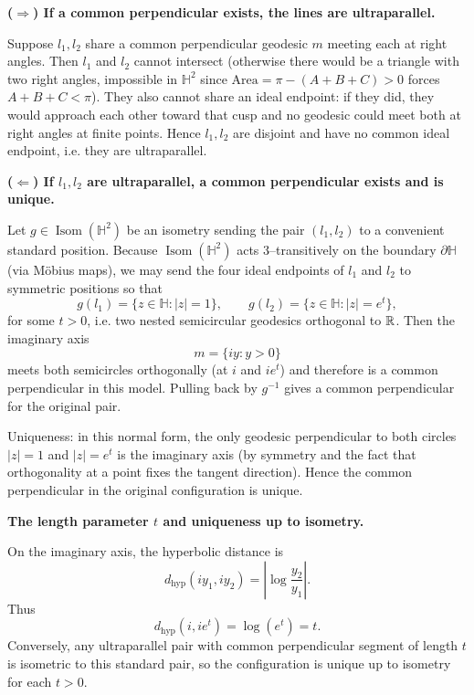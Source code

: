 \begin{solution}
\par\medskip\noindent\textbf{($\Rightarrow$) If a common perpendicular exists, the lines are ultraparallel.}\par\smallskip

	Suppose $l_1,l_2$ share a common perpendicular geodesic $m$ meeting each at right angles. Then $l_1$ and $l_2$
	cannot intersect (otherwise there would be a triangle with two right angles, impossible in $\mathbb{H}^2$ since
	$\text{Area}=\pi-(A+B+C)>0$ forces $A+B+C<\pi$). They also cannot share an ideal endpoint: if they did, they would
	approach each other toward that cusp and no geodesic could meet both at right angles at finite points.
	Hence $l_1,l_2$ are disjoint and have no common ideal endpoint, i.e. they are ultraparallel.
	
	\par\medskip\noindent\textbf{($\Leftarrow$) If $l_1,l_2$ are ultraparallel, a common perpendicular exists and is unique.}\par\smallskip

	Let $g\in\operatorname{Isom}(\mathbb{H}^2)$ be an isometry sending the pair $(l_1,l_2)$ to a convenient standard position.
	Because $\operatorname{Isom}(\mathbb{H}^2)$ acts $3$--transitively on the boundary $\partial\mathbb{H}$ (via M\"{o}bius maps),
	we may send the four ideal endpoints of $l_1$ and $l_2$ to symmetric positions so that
	\[
	g(l_1)=\{z\in\mathbb{H}:|z|=1\},\qquad g(l_2)=\{z\in\mathbb{H}:|z|=e^t\},
	\]
	for some $t>0$, i.e. two nested semicircular geodesics orthogonal to $\mathbb{R}$.
	Then the imaginary axis
	\[
	m=\{iy:y>0\}
	\]
	meets both semicircles orthogonally (at $i$ and $ie^t$) and therefore is a common perpendicular in this model.
	Pulling back by $g^{-1}$ gives a common perpendicular for the original pair.
	
	Uniqueness: in this normal form, the only geodesic perpendicular to both circles $|z|=1$ and $|z|=e^t$ is the
	imaginary axis (by symmetry and the fact that orthogonality at a point fixes the tangent direction).
	Hence the common perpendicular in the original configuration is unique.
	
	\par\medskip\noindent\textbf{The length parameter $t$ and uniqueness up to isometry.}\par\smallskip

	On the imaginary axis, the hyperbolic distance is
	\[
	d_{\mathrm{hyp}}(iy_1,iy_2)=\left|\log\frac{y_2}{y_1}\right|.
	\]
	Thus
	\[
	d_{\mathrm{hyp}}(i,ie^t)=\log(e^t)=t.
	\]
	Conversely, any ultraparallel pair with common perpendicular segment of length $t$ is isometric to this standard pair,
	so the configuration is unique up to isometry for each $t>0$.
	

\end{solution}
